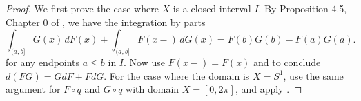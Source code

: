 \begin{proof}
We first prove the case where \(X\) is a closed interval \(I\). By Proposition 4.5, Chapter 0 of \autocite{revuzContinuousMartingalesBrownian1999}, we have the integration by parts
\[
\int_{(a, b]} G(x)\, dF(x) + \int_{(a, b]} F(x-) \, dG(x) = F(b) G(b) - F(a) G(a).
\]
for any endpoints \(a \leq b\) in \(I\). Now use \(F(x-) = F(x)\) and  to conclude \(d(FG) = G dF + F dG\). For the case where the domain is \(X = S^1\), use the same argument for \(F \circ q\) and \(G \circ q\) with domain \(X = [0, 2\pi]\), and apply .
\end{proof}